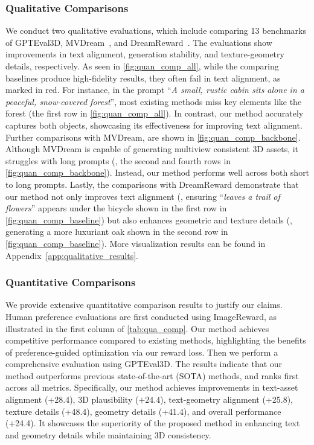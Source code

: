 \subsubsection{Qualitative Comparisons}
We conduct two qualitative evaluations, which include comparing 13 benchmarks of GPTEval3D, MVDream~\citep{shi2023mvdream}, and DreamReward~\citep{ye2025dreamreward}. The evaluations show improvements in text alignment, generation stability, and texture-geometry details, respectively.
As seen in \cref{fig:quan_comp_all}, while the comparing baselines produce high-fidelity results, they often fail in text alignment, as marked in red.
For instance, in the prompt ``\textit{A small, rustic cabin sits alone in a peaceful, snow-covered forest}'', most existing methods miss key elements like the forest (the first row in \cref{fig:quan_comp_all}).
In contrast, our method accurately captures both objects, showcasing its effectiveness for improving text alignment.
Further comparisons with MVDream, are shown in \cref{fig:quan_comp_backbone}.
Although MVDream is capable of generating multiview consistent 3D assets, it struggles with long prompts (\eg, the second and fourth rows in \cref{fig:quan_comp_backbone}).
Instead, our method performs well across both short to long prompts.
Lastly, the comparisons with DreamReward demonstrate that our method not only improves text alignment (\eg, ensuring ``\textit{leaves a trail of flowers}'' appears under the bicycle shown in the first row in \cref{fig:quan_comp_baseline}) but also enhances geometric and texture details (\eg, generating a more luxuriant oak shown in the second row in \cref{fig:quan_comp_baseline}).
More visualization results can be found in Appendix~\ref{app:qualitative_results}.


\subsubsection{Quantitative Comparisons}
We provide extensive quantitative comparison results to justify our claims.
Human preference evaluations are first conducted using ImageReward, as illustrated in the first column of \cref{tab:qua_comp}.
Our method achieves competitive performance compared to existing methods, highlighting the benefits of preference-guided optimization via our reward loss.
Then we perform a comprehensive evaluation using GPTEval3D. The results indicate that our method outperforms previous state-of-the-art (SOTA) methods, and ranks first across all metrics. Specifically, our method achieves improvements in text-asset alignment (+28.4), 3D plausibility ($+24.4$), text-geometry alignment (+25.8), texture details (+48.4), geometry details (+41.4), and overall performance (+24.4). 
It showcases the superiority of the proposed method in enhancing text and geometry details while maintaining 3D consistency.


